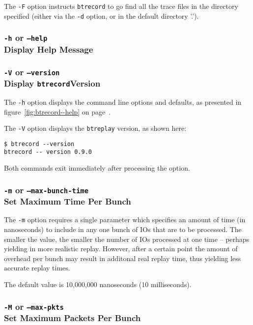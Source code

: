 \documentclass{article}
\begin{document}
The \texttt{-F} option instructs \texttt{btrecord} to go find all the
trace files in the directory specified (either via the \texttt{-d}
option, or in the default directory '.').

\subsubsection{\texttt{-h} or \texttt{--help}\\Display Help Message}
\subsubsection{\texttt{-V} or \texttt{--version}\\Display
\texttt{btrecord}Version}

The \texttt{-h} option displays the command line options and
defaults, as presented in figure~\ref{fig:btrecord--help} on
page~\pageref{fig:btrecord--help}.

The \texttt{-V} option displays the \texttt{btreplay} version, as shown here:

\begin{verbatim}
$ btrecord --version
btrecord -- version 0.9.0
\end{verbatim}

Both commands exit immediately after processing the option.

\subsubsection{\label{sec:c-o-m}\texttt{-m} or
\texttt{--max-bunch-time}\\Set Maximum Time Per Bunch}

The \texttt{-m} option requires a single parameter which specifies an
amount of time (in nanoseconds) to include in any one bunch of IOs that
are to be processed. The smaller the value, the smaller the number of
IOs processed at one time -- perhaps yielding in more realistic replay.
However, after a certain point the amount of overhead per bunch may result
in additonal real replay time, thus yielding less accurate replay times.

The default value is 10,000,000 nanoseconds (10 milliseconds).

\subsubsection{\label{sec:c-o-M}\texttt{-M} or
\texttt{--max-pkts}\\Set Maximum Packets Per Bunch}
\end{document}

